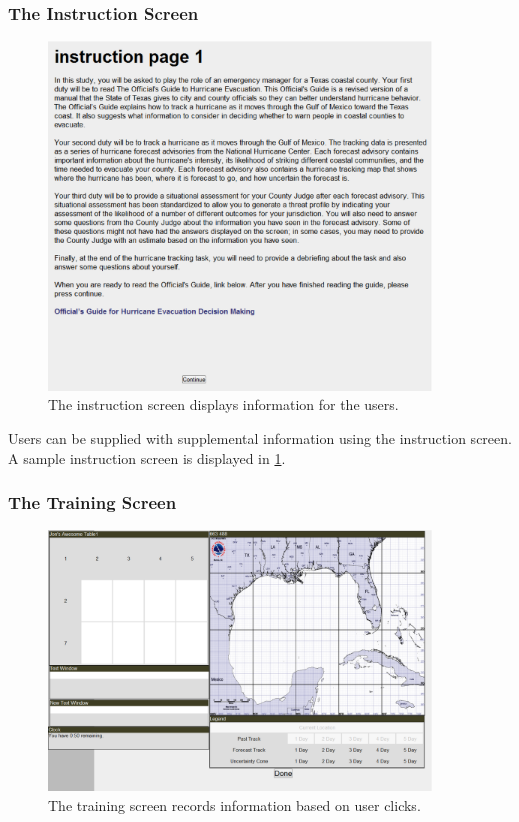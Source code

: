 \documentclass[article]{ij4uq}              %
\begin{document}
\subsubsection{The Instruction Screen}

\begin{figure}[h!]
 \centering
 \includegraphics[width=4.0in]{figures/instruction_page.eps}
 \caption{The instruction screen displays information for the users.}
 \label{fig:inst}
\end{figure}
\FloatBarrier

Users can be supplied with supplemental information using the instruction screen. A sample instruction screen is displayed in \ref{fig:inst}. 

\subsubsection{The Training Screen}

\begin{figure}[h!]
 \centering
 \includegraphics[width=4.0in]{figures/training_page.eps}
 \caption{The training screen records information based on user clicks.}
 \label{fig:train}
\end{figure}
\FloatBarrier
\end{document}
